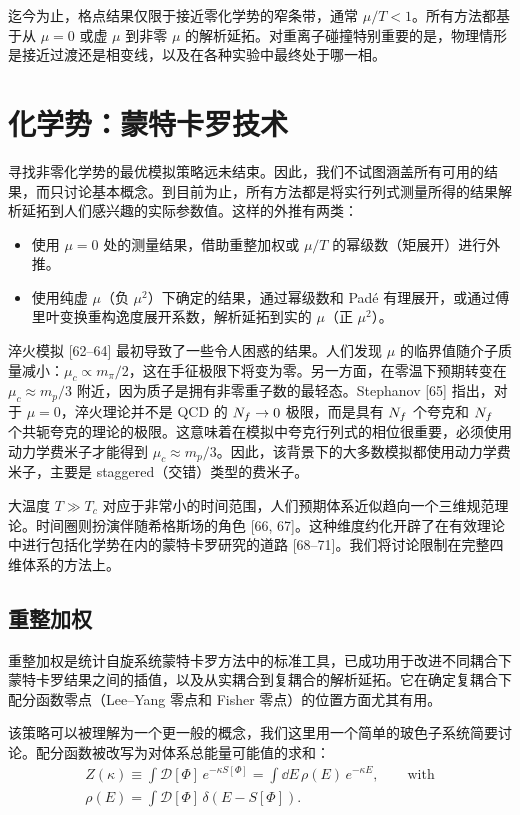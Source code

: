 迄今为止，格点结果仅限于接近零化学势的窄条带，通常 $\mu/T < 1$。所有方法都基于从 $\mu = 0$ 或虚 $\mu$ 到非零 $\mu$ 的解析延拓。对重离子碰撞特别重要的是，物理情形是接近过渡还是相变线，以及在各种实验中最终处于哪一相。

\section{化学势：蒙特卡罗技术}

寻找非零化学势的最优模拟策略远未结束。因此，我们不试图涵盖所有可用的结果，而只讨论基本概念。到目前为止，所有方法都是将实行列式测量所得的结果解析延拓到人们感兴趣的实际参数值。这样的外推有两类：
\begin{itemize}
  \item 使用 $\mu = 0$ 处的测量结果，借助重整加权或 $\mu/T$ 的幂级数（矩展开）进行外推。
  \item 使用纯虚 $\mu$（负 $\mu^2$）下确定的结果，通过幂级数和 Pad\'e 有理展开，或通过傅里叶变换重构逸度展开系数，解析延拓到实的 $\mu$（正 $\mu^2$）。
\end{itemize}

淬火模拟 [62--64] 最初导致了一些令人困惑的结果。人们发现 $\mu$ 的临界值随介子质量减小：$\mu_c \propto m_\pi/2$，这在手征极限下将变为零。另一方面，在零温下预期转变在 $\mu_c \approx m_p/3$ 附近，因为质子是拥有非零重子数的最轻态。Stephanov [65] 指出，对于 $\mu = 0$，淬火理论并不是 QCD 的 $N_f \to 0$ 极限，而是具有 $N_f$ 个夸克和 $N_f$ 个共轭夸克的理论的极限。这意味着在模拟中夸克行列式的相位很重要，必须使用动力学费米子才能得到 $\mu_c \approx m_p/3$。因此，该背景下的大多数模拟都使用动力学费米子，主要是 staggered（交错）类型的费米子。

大温度 $T \gg T_c$ 对应于非常小的时间范围，人们预期体系近似趋向一个三维规范理论。时间圈则扮演伴随希格斯场的角色 [66, 67]。这种维度约化开辟了在有效理论中进行包括化学势在内的蒙特卡罗研究的道路 [68--71]。我们将讨论限制在完整四维体系的方法上。

\subsection{重整加权}

重整加权是统计自旋系统蒙特卡罗方法中的标准工具，已成功用于改进不同耦合下蒙特卡罗结果之间的插值，以及从实耦合到复耦合的解析延拓。它在确定复耦合下配分函数零点（Lee--Yang 零点和 Fisher 零点）的位置方面尤其有用。

该策略可以被理解为一个更一般的概念，我们这里用一个简单的玻色子系统简要讨论。配分函数被改写为对体系总能量可能值的求和：
\begin{equation}
\begin{split}
  Z(\kappa) \equiv \int \mathcal{D}[\Phi]\,e^{-\kappa S[\Phi]}
    = \int\dd E\,\rho(E)\,e^{-\kappa E},
  \qquad \text{with} \\
  \rho(E) = \int \mathcal{D}[\Phi]\,\delta(E - S[\Phi]).
\end{split}
\end{equation}

